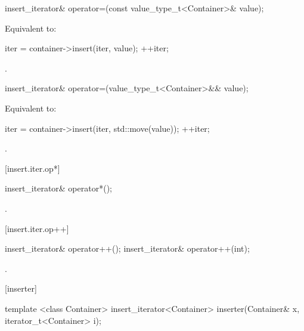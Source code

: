 %
\begin{itemdecl}
insert_iterator&
  operator=(const value_type_t<Container>& value);
\end{itemdecl}

\begin{itemdescr}
\pnum
\effects Equivalent to:
\begin{codeblock}
iter = container->insert(iter, value);
++iter;
\end{codeblock}

\pnum
\returns
{}.
\end{itemdescr}

%
\begin{itemdecl}
insert_iterator&
  operator=(value_type_t<Container>&& value);
\end{itemdecl}

\begin{itemdescr}
\pnum
\effects Equivalent to:
\begin{codeblock}
iter = container->insert(iter, std::move(value));
++iter;
\end{codeblock}

\pnum
\returns
{}.
\end{itemdescr}

[insert.iter.op*]{}

%
\begin{itemdecl}
insert_iterator& operator*();
\end{itemdecl}

\begin{itemdescr}
\pnum
\returns
{}.
\end{itemdescr}

[insert.iter.op++]{}

%
\begin{itemdecl}
insert_iterator& operator++();
insert_iterator& operator++(int);
\end{itemdecl}

\begin{itemdescr}
\pnum
\returns
{}.
\end{itemdescr}

[inserter]{}

%
\begin{itemdecl}
template <class Container>
  insert_iterator<Container> inserter(Container& x, iterator_t<Container> i);
\end{itemdecl}

